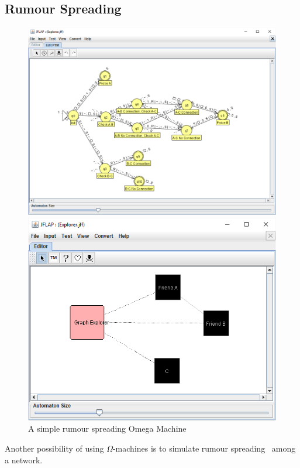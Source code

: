 \documentclass[12pt]{article}
\begin{document}
	\subsection{Rumour Spreading}
	\begin{figure}
		\includegraphics[width=\linewidth]{scenario-rum-tm}
		\smallskip\par
		\includegraphics[width=\linewidth]{scenario-rum-omega}
		\caption{A simple rumour spreading Omega Machine}
		\label{fig:rumour}
	\end{figure}
		Another possibility of using $\Omega$-machines is to simulate rumour spreading~\cite{Zhang2014} among a network.
\end{document}
